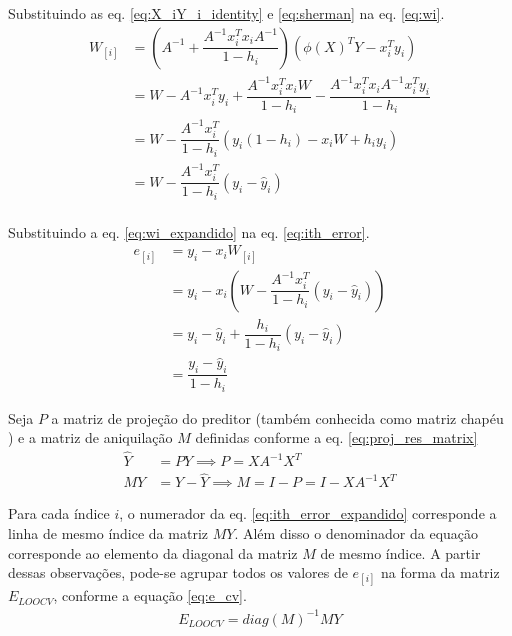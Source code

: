 Substituindo as eq. \ref{eq:X_iY_i_identity} e \ref{eq:sherman} na eq. \ref{eq:wi}.
\smallskip\noindent
\begin{equation}
    \begin{split}
        W_{[i]} &= \left(A^{-1} + \dfrac{A^{-1}x_i^Tx_iA^{-1}}{1-h_i}\right) \left(\phi(X)^TY - x_i^Ty_i\right)\\
                &= W - A^{-1}x_i^Ty_i + \dfrac{A^{-1}x_i^Tx_iW}{1-h_i} - \dfrac{A^{-1}x_i^Tx_iA^{-1}x_i^Ty_i}{1-h_i} \\
                &= W - \dfrac{A^{-1}x_i^T}{1-h_i}\left(  y_i(1-h_i)-x_iW  + h_iy_i \right)  \\
                &= W - \dfrac{A^{-1}x_i^T}{1-h_i}\left(  y_i-\hat{y}_i \right)  \\
    \end{split}
    \label{eq:wi_expandido}
\end{equation}

Substituindo a eq. \ref{eq:wi_expandido} na eq. \ref{eq:ith_error}.
\smallskip\noindent
\begin{equation}
    \begin{split}
        e_{[i]} &= y_i - x_iW_{[i]} \\
                &= y_i - x_i\left( W - \dfrac{A^{-1}x_i^T}{1-h_i}\left(  y_i-\hat{y}_i \right) \right) \\
                &= y_i - \hat{y}_i + \dfrac{h_i}{1-h_i}\left(  y_i-\hat{y}_i \right) \\
                &= \dfrac{y_i- \hat{y}_i}{1-h_i}
    \end{split}    
    \label{eq:ith_error_expandido}
\end{equation}

Seja $P$ a matriz de projeção \cite[p. 303]{applied_matrix_algebra} do preditor (também conhecida como matriz chapéu
 \cite[p. 266]{lin_reg_analysis}) e a matriz de aniquilação $M$ \cite[p. 18]{econometrics} definidas conforme a eq. \ref{eq:proj_res_matrix}
\smallskip\noindent
\begin{equation}
    \begin{split}
        \hat{Y} &= PY \implies P = XA^{-1}X^T \\
        MY &= Y - \hat{Y} \implies M = I - P = I - XA^{-1}X^T
    \end{split}    
    \label{eq:proj_res_matrix}
\end{equation}

Para cada índice $i$, o numerador da eq. \ref{eq:ith_error_expandido} corresponde a linha de mesmo índice da matriz $MY$. 
Além disso o denominador da equação corresponde ao elemento da diagonal da matriz $M$ de mesmo índice. 
A partir dessas observações, pode-se agrupar todos os valores de $e_{[i]}$ na forma da matriz $E_{LOOCV}$, conforme a equação \ref{eq:e_cv}.
\smallskip\noindent
\begin{equation}
    \begin{split}
        E_{LOOCV} = diag(M)^{-1}MY
    \end{split}    
    \label{eq:e_cv}
\end{equation}

